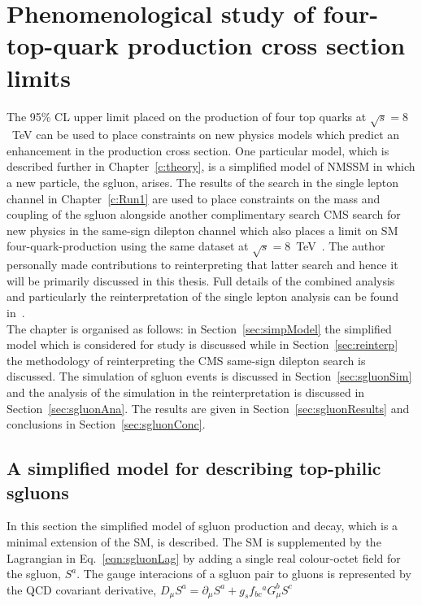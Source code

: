\chapter{Phenomenological study of \runone four-top-quark production cross section limits}
\label{c:pheno}

The 95\% CL upper limit placed on the production of four top quarks at $\sqrt{s}=8$~TeV can be used to place constraints on new physics models which predict an enhancement in the \tttt production cross section. One particular model, which is described further in Chapter~\ref{c:theory}, is a simplified model of NMSSM in which a new particle, the sgluon, arises. The results of the search in the single lepton channel in Chapter~\ref{c:Run1} are used to place constraints on the mass and coupling of the sgluon alongside another complimentary search CMS search for new physics in the same-sign dilepton channel which also places a limit on SM four-quark-production using the same dataset at $\sqrt{s}=8$~TeV~\cite{Chatrchyan:2013fea}. The author personally made contributions to reinterpreting that latter search and hence it will be primarily discussed in this thesis. Full details of the combined analysis and particularly the reinterpretation of the single lepton analysis can be found in~\cite{Beck201548}.\\
The chapter is organised as follows: in Section~\ref{sec:simpModel} the simplified model which is considered for study is discussed while in Section~\ref{sec:reinterp} the methodology of reinterpreting the CMS same-sign dilepton search is discussed. The simulation of sgluon events is discussed in Section~\ref{sec:sgluonSim} and the analysis of the simulation in the reinterpretation is discussed in Section~\ref{sec:sgluonAna}. The results are given in Section~\ref{sec:sgluonResults} and conclusions in Section~\ref{sec:sgluonConc}.

\section{A simplified model for describing top-philic sgluons \label{sec:simpModel} }
In this section the simplified model of sgluon production and decay, which is a minimal extension of the SM, is described. The SM is supplemented by the Lagrangian in Eq.~\ref{eqn:sgluonLag} by adding a single real colour-octet field for the sgluon, $S^{a}$. The gauge interacions of a sgluon pair to gluons is represented by the QCD covariant derivative, $D_{\mu}S^a= \partial_{\mu} S^a + g_s f_{bc}{}^a G_\mu^b S^c$


